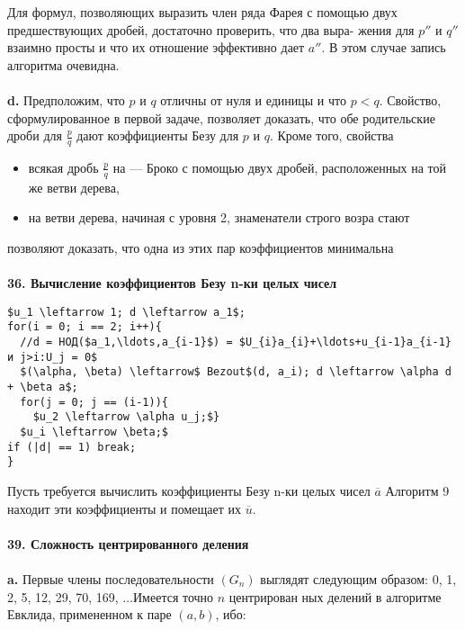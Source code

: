 \documentclass{mai_book}
\begin{document}
Для формул, позволяющих выразить член ряда Фарея с помощью\linebreak
двух предшествующих дробей, достаточно проверить, что два выра-\linebreak
жения для $p''$ и $q''$  взаимно просты и что их отношение эффективно\linebreak
дает $a''$. В этом случае запись алгоритма очевидна.\\
\\
\hspace*{15pt}\textbf{d.} Предположим, что $p$ и $q$ отличны от нуля и единицы и что $p < q$.\linebreak
Свойство, сформулированное в первой задаче, позволяет доказать, что
обе родительские дроби для $\frac{p}{q}$ дают коэффициенты Безу для $p$ и $q$.
Кроме того, свойства
		\begin{itemize}
				\item всякая дробь $\frac{p}{q}$ на — Броко с помощью\linebreak
двух дробей, расположенных на той же ветви дерева,
				\item на ветви дерева, начиная с уровня 2, знаменатели строго возра­\linebreak
стают
\end{itemize}
позволяют доказать, что одна из этих пар коэффициентов минимальна\\
\\
\noindent\textbf{36. Вычисление коэффициентов Безу n-ки целых чисел}\\
\begin{lstlisting}[mathescape = true, caption = {Коэффициенты Безу}]
$u_1 \leftarrow 1; d \leftarrow a_1$;
for(i = 0; i == 2; i++){
  //d = НОД($a_1,\ldots,a_{i-1}$) = $U_{i}a_{i}+\ldots+u_{i-1}a_{i-1} и j>i:U_j = 0$
  $(\alpha, \beta) \leftarrow$ Bezout$(d, a_i); d \leftarrow \alpha d + \beta a$;
  for(j = 0; j == (i-1)){
    $u_2 \leftarrow \alpha u_j;$}
  $u_i \leftarrow \beta;$
if (|d| == 1) break;
}
\end{lstlisting}
\newpage
Пусть требуется вычислить коэффициенты Безу n-ки целых чисел $\overline{a}$\linebreak
Алгоритм 9 находит эти коэффициенты и помещает их $\overline{u}$.\\
\\
\noindent\textbf{39. Сложность центрированного деления}\\
\\
\hspace*{15pt}\textbf{a.} Первые члены последовательности $(G_n)$ выглядят следующим\linebreak
образом: 0, 1, 2, 5, 12, 29, 70, 169, ...Имеется точно $n$ центрирован­\linebreak
ных делений в алгоритме Евклида, примененном к паре $(a, b)$, ибо:
\end{document}
